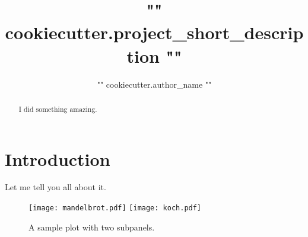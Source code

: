 \documentclass[twocolumn]{aastex631}
\begin{document}
\title{{ "{" }}{{ cookiecutter.project_short_description }}{{ "}" }}

\author{{ "{" }}{{ cookiecutter.author_name }}{{ "}" }}

\begin{abstract}
    I did something amazing.
\end{abstract}

\section{Introduction}
Let me tell you all about it.

\begin{figure}[ht!]
    \begin{centering}
        \texttt{[image: mandelbrot.pdf]}
        \texttt{[image: koch.pdf]}
        \caption{
            A sample plot with two subpanels.
        }
        \label{fig:fractals}
    \end{centering}
\end{figure}
\end{document}
